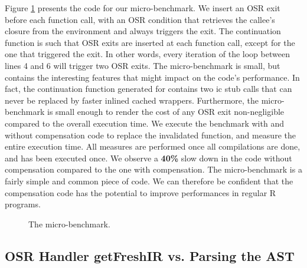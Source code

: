 Figure \ref{fig:microbenchmark} presents the code for our micro-benchmark. 
We insert an OSR exit before each function call, with an OSR condition that retrieves the callee's closure from the environment and always triggers the exit.
The continuation function is such that OSR exits are inserted at each function call, except for the one that triggered the exit.
In other words, every iteration of the loop between lines 4 and 6 will trigger two OSR exits.
The micro-benchmark is small, but contains the interesting features that might impact on the code's performance.
In fact, the continuation function generated for  contains two ic stub calls that can never be replaced by faster inlined cached wrappers.
Furthermore, the micro-benchmark is small enough to render the cost of any OSR exit non-negligible compared to the overall execution time.
We execute the benchmark with and without compensation code to replace the invalidated function, and measure the entire execution time.
All measures are performed once all compilations are done, and  has been executed once.
We observe a \textbf{40\%} slow down in the code without compensation compared to the one with compensation.
The micro-benchmark is a fairly simple and common piece of code.
We can therefore be confident that the compensation code has the potential to improve performances in regular R programs.
\\

\begin{figure}[h]
\caption{The micro-benchmark.}
\label{fig:microbenchmark}
\end{figure}


\subsection{OSR Handler getFreshIR vs. Parsing the AST}\label{section:getfreshtest}


